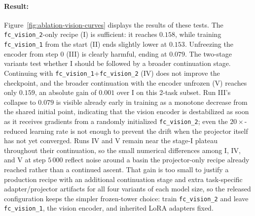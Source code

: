 \paragraph{Result:}
Figure~\ref{fig:ablation-vision-curves} displays the results of these tests.
The \texttt{fc\_vision\_2}-only recipe (I) is sufficient: it reaches $0.158$, while training \texttt{fc\_vision\_1} from the start (II) ends slightly lower at $0.153$.
Unfreezing the encoder from step $0$ (III) is clearly harmful, ending at $0.079$.
The two-stage variants test whether I should be followed by a broader continuation stage.
Continuing with \texttt{fc\_vision\_1}+\texttt{fc\_vision\_2} (IV) does not improve the checkpoint, and the broader continuation with the encoder unfrozen (V) reaches only $0.159$, an absolute gain of $0.001$ over I on this 2-task subset.
Run III's collapse to $0.079$ is visible already early in training as a monotone decrease from the shared initial point, indicating that the vision encoder is destabilized as soon as it receives gradients from a randomly initialized \texttt{fc\_vision\_2}; even the $20\times$-reduced learning rate is not enough to prevent the drift when the projector itself has not yet converged.
Runs IV and V remain near the stage-I plateau throughout their continuation, so the small numerical differences among I, IV, and V at step $5\,000$ reflect noise around a basin the projector-only recipe already reached rather than a continued ascent.
That gain is too small to justify a production recipe with an additional continuation stage and extra task-specific adapter/projector artifacts for all four variants of each model size, so the released configuration keeps the simpler frozen-tower choice: train \texttt{fc\_vision\_2} and leave \texttt{fc\_vision\_1}, the vision encoder, and inherited LoRA adapters fixed.

